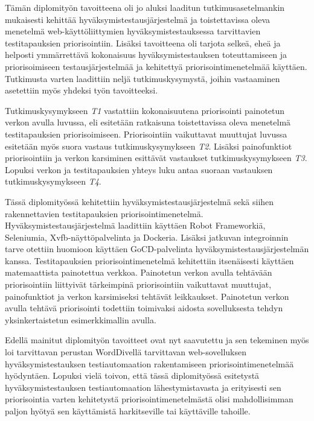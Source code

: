 Tämän diplomityön tavoitteena oli jo aluksi laaditun tutkimusasetelmankin mukaisesti kehittää hyväksymistestausjärjestelmä ja toistettavissa oleva menetelmä web-käyttöliittymien hyväksymistestauksessa tarvittavien testitapauksien priorisointiin.
Lisäksi tavoitteena oli tarjota selkeä, eheä ja helposti ymmärrettävä kokonaisuus hyväksymistestauksen toteuttamiseen ja priorisoimiseen testausjärjestelmää ja kehitettyä priorisointimenetelmää käyttäen.
Tutkimusta varten laadittiin neljä tutkimuskysymystä, joihin vastaaminen asetettiin myös yhdeksi työn tavoitteeksi.

Tutkimuskysymykseen \emph{T1} vastattiin kokonaisuutena priorisointi painotetun verkon avulla luvussa, eli esitetään ratkaisuna toistettavissa oleva menetelmä testitapauksien priorisoimiseen.
Priorisointiin vaikuttavat muuttujat luvussa esitetään myös suora vastaus tutkimuskysymykseen \emph{T2}.
Lisäksi painofunktiot priorisointiin ja verkon karsiminen esittävät vastaukset tutkimuskysymykseen \emph{T3}.
Lopuksi verkon ja testitapauksien yhteys luku antaa suoraan vastauksen tutkimuskysymykseen \emph{T4}.

Tässä diplomityössä kehitettiin hyväksymistestausjärjestelmä sekä siihen rakennettavien testitapauksien priorisointimenetelmä.
Hyväksymistestausjärjestelmä laadittiin käyttäen Robot Frameworkiä, Seleniumia, Xvfb-näyttöpalvelinta ja Dockeria.
Lisäksi jatkuvan integroinnin tarve otettiin huomioon käyttäen GoCD-palvelinta hyväksymistestausjärjestelmän kanssa.
Testitapauksien priorisointimenetelmä kehitettiin itsenäisesti käyttäen matemaattista painotettua verkkoa.
Painotetun verkon avulla tehtävään priorisointiin liittyivät tärkeimpinä priorisointiin vaikuttavat muuttujat, painofunktiot ja verkon karsimiseksi tehtävät leikkaukset.
Painotetun verkon avulla tehtävä priorisointi todettiin toimivaksi aidosta sovelluksesta tehdyn yksinkertaistetun esimerkkimallin avulla.

Edellä mainitut diplomityön tavoitteet ovat nyt saavutettu ja sen tekeminen myös loi tarvittavan perustan WordDivellä tarvittavan web-sovelluksen hyväksymistestauksen testiautomaation rakentamiseen priorisointimenetelmää hyödyntäen.
Lopuksi vielä toivon, että tässä diplomityössä esitetystä hyväksymistestauksen testiautomaation lähestymistavasta ja erityisesti sen priorisointia varten kehitetystä priorisointimenetelmästä olisi mahdollisimman paljon hyötyä sen käyttämistä harkitseville tai käyttäville tahoille.